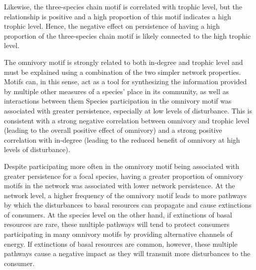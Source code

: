 \documentclass[12pt]{article}
\begin{document}
\begin{spacing}{2.0}
Likewise, the three-species chain motif is correlated with trophic level, but the relationship is positive and a high proportion of this motif indicates a high trophic level. Hence, the negative effect on persistence of having a high proportion of the three-species chain motif is likely connected to the high trophic level. 

The omnivory motif is strongly related to both in-degree and trophic level and must be explained using a combination of the two simpler network properties.
Motifs can, in this sense, act as a tool for synthesizing the information provided by multiple other measures of a species' place in its community, as well as interactions between them
Species participation in the omnivory motif was associated with greater persistence, especially at low levels of disturbance.
This is consistent with a strong negative correlation between omnivory and trophic level (leading to the overall positive effect of omnivory) and a strong positive correlation with in-degree (leading to the reduced benefit of omnivory at high levels of disturbance). 


Despite participating more often in the omnivory motif being associated with greater persistence for a focal species, having a greater proportion of omnivory motifs in the network was associated with lower network persistence.
At the network level, a higher frequency of the omnivory motif leads to more pathways by which the disturbances to basal resources can propagate and cause extinctions of consumers.
At the species level on the other hand, if extinctions of basal resources are rare, these multiple pathways will tend to protect consumers participating in many omnivory motifs by providing alternative channels of energy.
If extinctions of basal resources are common, however, these multiple pathways cause a negative impact as they will transmit more disturbances to the consumer.


\end{spacing}
\end{document}
